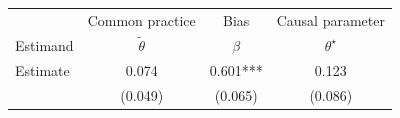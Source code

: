 
\begin{tabular}[t]{lccc}
\toprule
\multicolumn{1}{c}{ } & \multicolumn{1}{c}{Common practice} & \multicolumn{1}{c}{Bias} & \multicolumn{1}{c}{Causal parameter} \\
Estimand & $\tilde{\theta}$ & $\beta$ & $\theta^\star$\\
\midrule
Estimate & 0.074 & 0.601*** & 0.123\\
 & (0.049) & (0.065) & (0.086)\\
\bottomrule
\end{tabular}
